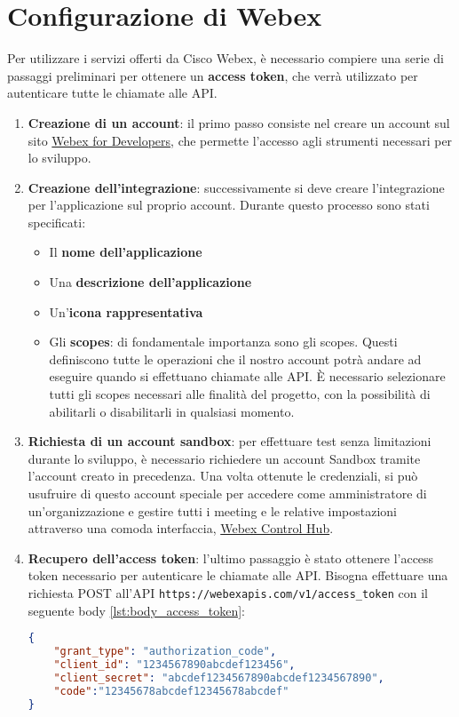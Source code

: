\section{Configurazione di Webex}
Per utilizzare i servizi offerti da Cisco Webex, è necessario compiere una serie di passaggi
preliminari per ottenere un \textbf{access token}, che verrà utilizzato per autenticare tutte le chiamate alle API.

\begin{enumerate}

    \item \textbf{Creazione di un account}: il primo passo consiste nel creare
    un account sul sito \href{https://developer.webex.com/}{Webex for Developers}, che permette 
    l'accesso agli strumenti necessari per lo sviluppo.
    
    \item \textbf{Creazione dell'integrazione}: successivamente si deve creare l'integrazione per 
    l'applicazione sul proprio account. Durante questo processo sono stati specificati:
        \begin{itemize}
            \item Il \textbf{nome dell'applicazione}
            \item Una \textbf{descrizione dell'applicazione}
            \item Un'\textbf{icona rappresentativa}
            \item Gli \textbf{scopes}: di fondamentale importanza sono gli scopes. Questi definiscono tutte le operazioni
            che il nostro account potrà andare ad eseguire  quando si effettuano chiamate alle API. È necessario
            selezionare tutti gli scopes necessari alle finalità del progetto, con la possibilità di abilitarli 
            o disabilitarli in qualsiasi momento.
        \end{itemize}
 
    \item \textbf{Richiesta di un account sandbox}: per effettuare test senza limitazioni durante lo sviluppo,
    è necessario richiedere un account Sandbox tramite l'account creato in precedenza. Una volta ottenute
    le credenziali, si può usufruire di questo account speciale per accedere come amministratore di un'organizzazione 
    e gestire tutti i meeting e le relative impostazioni attraverso una comoda interfaccia, 
    \href{https://admin.webex.com/login}{Webex Control Hub}.
    \cite{WebexSandboxAccount}
    
    \item \textbf{Recupero dell'access token}: l'ultimo passaggio è stato ottenere l'access token 
    necessario per autenticare le chiamate alle API.
    Bisogna effettuare una richiesta POST all'API
    \texttt{https://webexapis.com/v1/access\_token} con il seguente body \ref{lst:body_access_token}:
    \begin{lstlisting}[language=json, label={lst:body_access_token}, caption={body access token}]
{
    "grant_type": "authorization_code",
    "client_id": "1234567890abcdef123456",
    "client_secret": "abcdef1234567890abcdef1234567890",
    "code":"12345678abcdef12345678abcdef"
}
    \end{lstlisting}


\end{enumerate}
